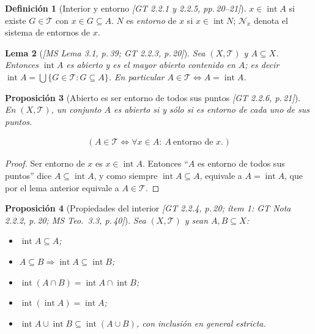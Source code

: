 \documentclass[11pt,a4paper]{article}
\newenvironment{lista}{\leavevmode\begin{itemize}[leftmargin=1.5em,itemsep=1pt,topsep=2pt,parsep=0pt]}{\end{itemize}}
\newcommand{\lgc}[1]{\par\vspace{-3pt}\begin{gather*}\big(\;#1\;\big)\end{gather*}\vspace{-6pt}}
\theoremstyle{definition}
\newtheorem{definicion}{Definición}[section]
\theoremstyle{plain}
\newtheorem{proposicion}[definicion]{Proposición}
\newtheorem{lema}[definicion]{Lema}
\newcommand{\fnt}[1]{{\normalfont\small\itshape\color{gray!150!black}[#1]}}
\newcommand{\intr}{\operatorname{int}}
\newcommand{\tp}{\mathcal{T}}
\begin{document}
\begin{definicion}[Interior y entorno \fnt{GT 2.2.1 y 2.2.5, pp.\,20--21}]
$x\in\intr A$ si existe $G\in\tp$ con $x\in G\subseteq A$. $N$ es \emph{entorno} de $x$ si $x\in\intr N$; $\mathcal{N}_x$ denota el sistema de entornos de $x$.
\end{definicion}

\begin{lema}[\fnt{MS Lema 3.1, p.\,39; GT 2.2.3, p.\,20}]
Sea $(X,\tp)$ y $A\subseteq X$. Entonces $\intr A$ es abierto y es el \emph{mayor} abierto contenido en $A$; es decir $\intr A=\bigcup\{G\in\tp: G\subseteq A\}$. En particular $A\in\tp\iff A=\intr A$.
\end{lema}

\begin{proposicion}[Abierto es ser entorno de todos sus puntos \fnt{GT 2.2.6, p.\,21}]\label{hu:abent}
En $(X,\tp)$, un conjunto $A$ es abierto si y sólo si es entorno de cada uno de sus puntos.
\lgc{A\in\tp\iff \forall x\in A:\ A\ \text{entorno de } x.}
\end{proposicion}

\begin{proof}
Ser entorno de $x$ es $x\in\intr A$. Entonces ``$A$ es entorno de todos sus puntos'' dice $A\subseteq\intr A$, y como siempre $\intr A\subseteq A$, equivale a $A=\intr A$, que por el lema anterior equivale a $A\in\tp$.
\end{proof}

\begin{proposicion}[Propiedades del interior \fnt{GT 2.2.4, p.\,20; ítem 1: GT Nota 2.2.2, p.\,20; MS Teo.\ 3.3, p.\,40}]
Sea $(X,\tp)$ y sean $A,B\subseteq X$:
\begin{lista}
\item $\intr A\subseteq A$;
\item $A\subseteq B\Rightarrow\intr A\subseteq\intr B$;
\item $\intr(A\cap B)=\intr A\cap\intr B$;
\item $\intr(\intr A)=\intr A$;
\item $\intr A\cup\intr B\subseteq\intr(A\cup B)$, con inclusión en general estricta.
\end{lista}
\end{proposicion}
\end{document}
